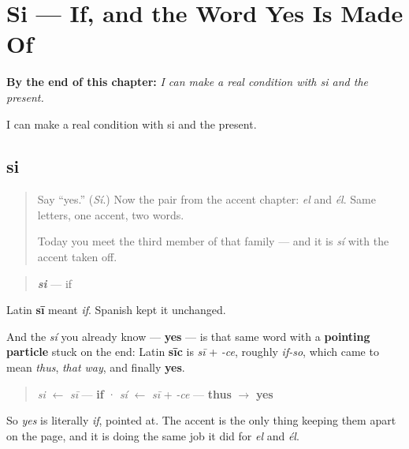 
\chapter{Si --- If, and the Word Yes Is Made Of}
\label{ch:si}

\begin{chapteropening}
\textbf{By the end of this chapter:} \emph{I can make a real condition with si and the present.}

I can make a real condition with si and the present.
\end{chapteropening}

\section[si]{si}

\label{lesson:ES-C55-si}



\begin{quote}
Say \textquotedblleft{}yes.\textquotedblright{} (\emph{Sí}.) Now the pair from the accent chapter: \emph{el} and \emph{él}. Same letters, one accent, two words.

Today you meet the third member of that family — and it is \emph{sí} with the accent taken off.
\end{quote}

\begin{cousinweb}
\begin{quote}
\emph{\textbf{si}} — if
\end{quote}

Latin \textbf{sī} meant \emph{if}. Spanish kept it unchanged.

And the \emph{sí} you already know — \textbf{yes} — is that same word with a \textbf{pointing particle} stuck on the end: Latin \textbf{sīc} is \emph{sī} + \emph{-ce}, roughly \emph{if-so}, which came to mean \emph{thus}, \emph{that way}, and finally \textbf{yes}.

\begin{quote}
\emph{si} $\leftarrow$ \emph{sī} — \textbf{if}  ·  \emph{sí} $\leftarrow$ \emph{sī} + \emph{-ce} — \textbf{thus} $\to$ \textbf{yes}
\end{quote}

So \emph{yes} is literally \emph{if}, pointed at. The accent is the only thing keeping them apart on the page, and it is doing the same job it did for \emph{el} and \emph{él}.
\end{cousinweb}

